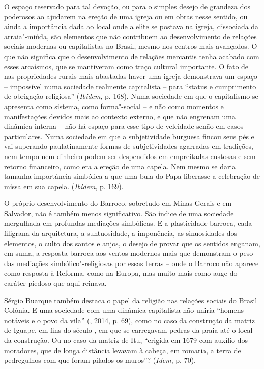 O espaço reservado para tal devoção, ou para o simples desejo de
grandeza dos poderosos ao ajudarem na ereção de uma igreja ou em obras
nesse sentido, ou ainda a importância dada ao local onde a elite se
postava na igreja, dissociada da arraia"-miúda, são elementos que não
contribuem ao desenvolvimento de relações sociais modernas ou
capitalistas no Brasil, mesmo nos centros mais avançados. O que não
significa que o desenvolvimento de relações mercantis tenha acabado com
esses arcaísmos, que se mantiveram como traço cultural importante. O fato de nas
propriedades rurais mais abastadas haver uma igreja demonstrava um
espaço -- impossível numa sociedade realmente capitalista -- para
``status e cumprimento de obrigação religiosa'' (\emph{Ibidem}, p. 168).
Numa sociedade em que o capitalismo se apresenta como sistema, como
forma"-social -- e não como momentos e manifestações devidos mais ao
contexto externo, e que não engrenam uma dinâmica interna -- não há
espaço para esse tipo de veleidade senão em casos particulares.
Numa sociedade em que a subjetividade burguesa fincou seus pés e vai superando
paulatinamente formas de subjetividades agarradas em tradições, nem tempo nem dinheiro
podem ser despendidos em empreitadas custosas e sem retorno financeiro,
como era a ereção de uma capela. Nem mesmo se daria tamanha importância
simbólica a que uma bula do Papa liberasse a celebração de missa em sua
capela. (\emph{Ibidem}, p. 169).

O próprio desenvolvimento do Barroco,
sobretudo em Minas Gerais e em Salvador, não é também menos
significativo. São índice de uma sociedade mergulhada em profundas
mediações simbólicas. E a plasticidade barroca, cada filigrana da
arquitetura, a suntuosidade, a imponência, as sinuosidades dos
elementos, o culto dos santos e anjos, o desejo de provar que os
sentidos enganam, em suma, a resposta barroca aos ventos modernos mais
que demonstram o peso das mediações simbólico"-religiosas por essas
terras -- onde o Barroco não aparece como resposta à Reforma, como na
Europa, mas muito mais como auge do caráter piedoso que aqui
reinava.

Sérgio Buarque também destaca o papel da religião nas relações sociais
do Brasil Colônia. E uma sociedade com uma dinâmica capitalista
não uniria ``homens notáveis e o povo da vila'' (, 2014, p. 69),
como no caso da construção da matriz de Iguape, em fins do século ,
em que se carregavam pedras da praia até o local da construção. Ou no
caso da matriz de Itu, ``erigida em 1679 com auxílio dos moradores, que
de longa distância levavam à cabeça, em romaria, a terra de pedregulhos
com que foram pilados os muros''? (\emph{Idem}, p. 70).

